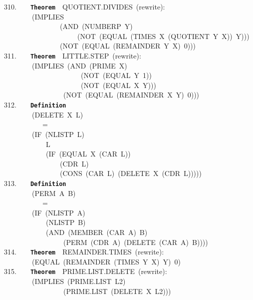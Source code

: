 \documentclass[11pt]{book}
\newenvironment{pubasis}{\begin{flushleft}\ttfamily\small}{\normalsize\rmfamily\end{flushleft}}
\newcommand{\axiomordefinition}[1]{\vspace{6pt}\texttt{\textbf{#1}}}
\begin{document}
\begin{pubasis}
310.~~~~\axiomordefinition{Theorem}~~QUOTIENT.DIVIDES~(rewrite):\\
~~~~~~~~(IMPLIES\\
~~~~~~~~~~~~~~~~(AND~(NUMBERP~Y)\\
~~~~~~~~~~~~~~~~~~~~~(NOT~(EQUAL~(TIMES~X~(QUOTIENT~Y~X))~Y)))\\
~~~~~~~~~~~~~~~~(NOT~(EQUAL~(REMAINDER~Y~X)~0)))\\

311.~~~~\axiomordefinition{Theorem}~~LITTLE.STEP~(rewrite):\\
~~~~~~~~(IMPLIES~(AND~(PRIME~X)\\
~~~~~~~~~~~~~~~~~~~~~~(NOT~(EQUAL~Y~1))\\
~~~~~~~~~~~~~~~~~~~~~~(NOT~(EQUAL~X~Y)))\\
~~~~~~~~~~~~~~~~~(NOT~(EQUAL~(REMAINDER~X~Y)~0)))\\

312.~~~~\axiomordefinition{Definition}\\
~~~~~~~~(DELETE~X~L)\\
~~~~~~~~~~~=\\
~~~~~~~~(IF~(NLISTP~L)\\
~~~~~~~~~~~~L\\
~~~~~~~~~~~~(IF~(EQUAL~X~(CAR~L))\\
~~~~~~~~~~~~~~~~(CDR~L)\\
~~~~~~~~~~~~~~~~(CONS~(CAR~L)~(DELETE~X~(CDR~L)))))\\

313.~~~~\axiomordefinition{Definition}\\
~~~~~~~~(PERM~A~B)\\
~~~~~~~~~~~=\\
~~~~~~~~(IF~(NLISTP~A)\\
~~~~~~~~~~~~(NLISTP~B)\\
~~~~~~~~~~~~(AND~(MEMBER~(CAR~A)~B)\\
~~~~~~~~~~~~~~~~~(PERM~(CDR~A)~(DELETE~(CAR~A)~B))))\\

314.~~~~\axiomordefinition{Theorem}~~REMAINDER.TIMES~(rewrite):\\
~~~~~~~~(EQUAL~(REMAINDER~(TIMES~Y~X)~Y)~0)\\

315.~~~~\axiomordefinition{Theorem}~~PRIME.LIST.DELETE~(rewrite):\\
~~~~~~~~(IMPLIES~(PRIME.LIST~L2)\\
~~~~~~~~~~~~~~~~~(PRIME.LIST~(DELETE~X~L2)))\\


\end{pubasis}
\end{document}
